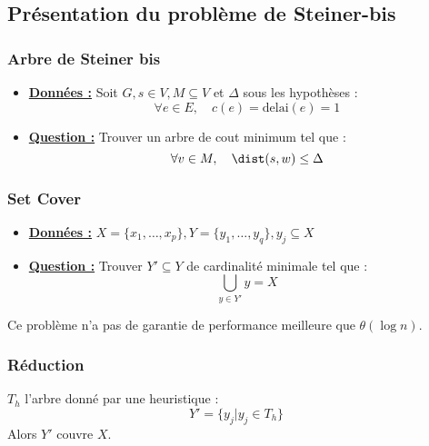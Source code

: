 \documentclass[a4paper,11pt]{thesis}
\begin{document}
\subsection{Pr\'{e}sentation du probl\`{e}me de Steiner-bis}

\subsubsection*{Arbre de Steiner bis}
\begin{itemize}
    \item[] \textbf{\underline{Données :}} Soit $G, s \in V, M \subseteq V$ et $\Delta$ sous les
        hypothèses : \begin{displaymath}
            \forall e \in E, \quad c(e) = \mbox{delai}(e) = 1
        \end{displaymath}
    \item[] \textbf{\underline{Question :}} Trouver un arbre de cout minimum tel que :
        \begin{displaymath}
            \forall v \in M,\quad \dist(s, w) \leq \Delta
        \end{displaymath}
\end{itemize}

\subsubsection*{Set Cover}

\begin{itemize}
    \item[] \textbf{\underline{Données :}} $X = \{x_1, \dots, x_p\}, Y = \{y_1, \dots, y_q\}, y_j
        \subseteq X$
    \item[] \textbf{\underline{Question :}} Trouver $Y' \subseteq Y$ de cardinalité minimale tel que
        :\begin{displaymath}
            \bigcup_{y \in Y'} y = X
        \end{displaymath}
\end{itemize}

Ce problème n'a pas de garantie de performance meilleure que $\theta(\log n)$.

\subsubsection*{R\'{e}duction}


$T_h$ l'arbre donné par une heuristique : 
\begin{displaymath}
    Y' = \{y_j | y_j \in T_h \}
\end{displaymath}
Alors $Y'$ couvre $X$.
\end{document}
